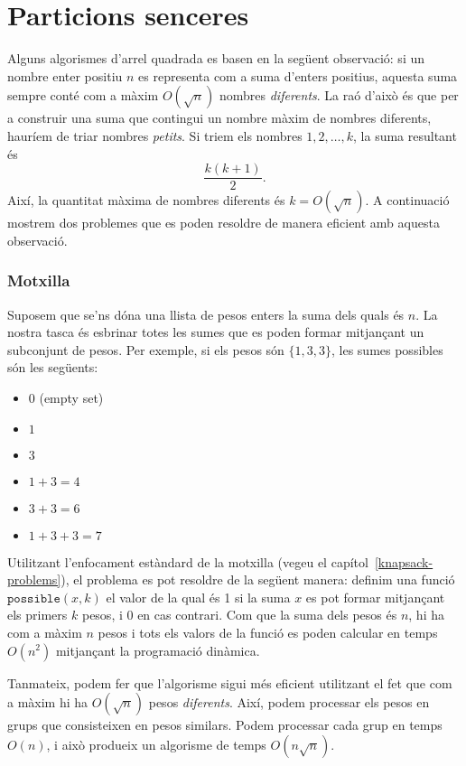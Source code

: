 \section{Particions senceres}

Alguns algorismes d'arrel quadrada es basen en la següent observació:
si un nombre enter positiu $n$ es representa com a suma d'enters
positius, aquesta suma sempre conté com a màxim $O(\sqrt n)$ nombres
\emph{diferents}. La raó d'això és que per a construir una suma que
contingui un nombre màxim de nombres diferents, hauríem de triar
nombres \emph{petits}. Si triem els nombres $1,2,\ldots,k$, la suma
resultant és
\[\frac{k(k+1)}{2}.\]
Així, la quantitat màxima de nombres diferents és $k = O(\sqrt n)$. A
continuació mostrem dos problemes que es poden resoldre de manera
eficient amb aquesta observació.

\subsubsection{Motxilla}

Suposem que se'ns dóna una llista de pesos enters la suma dels quals
és $n$. La nostra tasca és esbrinar totes les sumes que es poden
formar mitjançant un subconjunt de pesos. Per exemple, si els pesos
són $\{1,3,3\}$, les sumes possibles són les següents:


\begin{itemize}[noitemsep]
\item $0$ (empty set)
\item $1$
\item $3$
\item $1+3=4$
\item $3+3=6$
\item $1+3+3=7$
\end{itemize}


Utilitzant l'enfocament estàndard de la motxilla (vegeu el
capítol~\ref{knapsack-problems}), el problema es pot resoldre de la
següent manera: definim una funció $\texttt{possible}(x,k)$ el valor
de la qual és 1 si la suma $x$ es pot formar mitjançant els primers $k$
pesos, i 0 en cas contrari. Com que la suma dels pesos és $n$, hi ha
com a màxim $n$ pesos i tots els valors de la funció es poden calcular
en temps $O(n^2)$ mitjançant la programació dinàmica.

Tanmateix, podem fer que l'algorisme sigui més eficient utilitzant el
fet que com a màxim hi ha $O(\sqrt n)$ pesos \emph{diferents}. Així,
podem processar els pesos en grups que consisteixen en pesos
similars. Podem processar cada grup en temps $O(n)$, i això produeix un
algorisme de temps $O(n \sqrt n)$.

